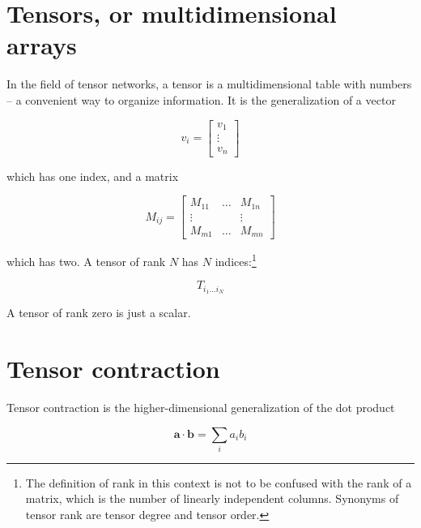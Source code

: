 \section{Tensors, or multidimensional arrays}


In the field of tensor networks, a tensor is a multidimensional table with numbers -- a convenient
way to organize information. It is the generalization of a vector

\begin{equation}
  v_i =
  \begin{bmatrix}
    v_1 \\
    \vdots \\
    v_n
  \end{bmatrix}
\end{equation}

which has one index, and a matrix

\begin{equation}
  M_{i j} = 
  \begin{bmatrix}
  M_{1 1} & \dots & M_{1 n} \\
  \vdots  & & \vdots \\
  M_{m 1} & \dots & M_{m n} 
  \end{bmatrix}
\end{equation}

which has two. A tensor of rank $N$ has $N$ indices:\footnote{The definition of rank in this
context is not to be confused with the rank of a matrix, which is the number of
linearly independent columns. Synonyms of tensor rank are tensor degree and
tensor order.}

\begin{equation}
  T_{i_1 \dots i_N}
\end{equation}

A tensor of rank zero is just a scalar.

\section{Tensor contraction}

Tensor contraction is the higher-dimensional generalization of the dot product

\begin{equation}
  \bm{a} \cdot \bm{b} = \sum_i a_i b_i
\end{equation}

